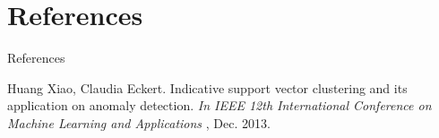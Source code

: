 \documentclass[10pt]{beamer}
\begin{document}
\section{References}
\begin{frame}{References}
\begin{thebibliography}{99}
Huang Xiao, Claudia Eckert. Indicative support vector clustering and its application on anomaly detection.  \textit{In IEEE 12th International Conference on Machine Learning and Applications }, Dec. 2013.
\end{thebibliography}
\end{frame}

\end{document}
